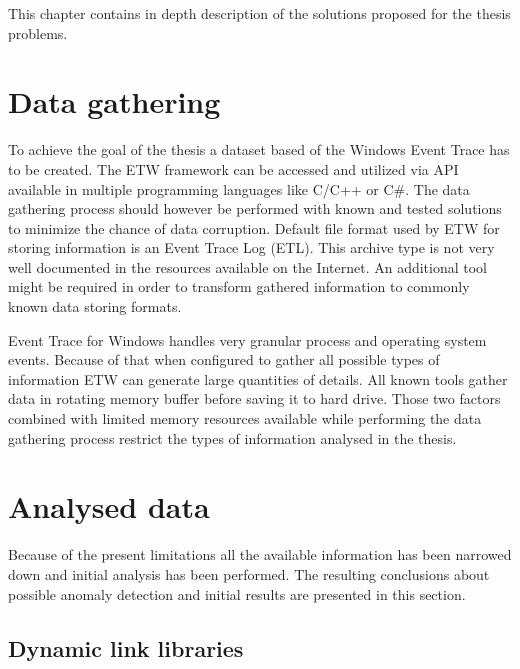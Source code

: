 \documentclass[a4paper,twoside,12pt]{book}
\begin{document}
This chapter contains in depth description of the solutions proposed for the thesis problems. 

\section{Data gathering}

To achieve the goal of the thesis a dataset based of the Windows Event Trace has to 
be created. The ETW framework can be accessed and utilized via API available in multiple
programming languages like C/C++\cite{bib:etwcpp} or C\#\cite{bib:etwcsharp}. The 
data gathering process should however be performed with known and tested solutions to
minimize the chance of data corruption. Default file format used by ETW for storing 
information is an Event Trace Log (ETL). This archive type is not very well documented in 
the resources available on the Internet. An additional tool might be required in order to 
transform gathered information to commonly known data storing formats.

Event Trace for Windows handles very granular process and operating system events.
Because of that when configured to gather all possible types of information ETW can generate
large quantities of details. All known tools gather data in rotating memory buffer 
before saving it to hard drive. Those two factors combined with limited memory resources 
available while performing the data gathering process restrict the types of information analysed 
in the thesis. 

\section{Analysed data}

Because of the present limitations all the available information has been narrowed down and 
initial analysis has been performed. The resulting conclusions about possible anomaly detection 
and initial results are presented in this section.

\subsection{Dynamic link libraries}
\end{document}
